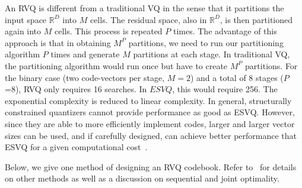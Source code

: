An RVQ is different from a traditional VQ in the sense that it partitions the input space $\mathbb{R}^D$ into $M$ cells.  The residual space, also in $\mathbb{R}^D$, is then partitioned again into $M$ cells.  This process is repeated $P$ times.  The advantage of this approach is that in obtaining $M^P$ partitions, we need to run our partitioning algorithm $P$ times and generate $M$ partitions at each stage.  In traditional VQ, the partitioning algorithm would run once but have to create $M^P$ partitions.  For the binary case (two code-vectors per stage, $M=2$) and a total of 8 stages ($P$=8), RVQ only requires 16 searches.  In $ESVQ$, this would require 256.  The exponential complexity is reduced to linear complexity.  In general, structurally constrained quantizers cannot provide performance as good as ESVQ.  However, since they are able to more efficiently implement codes, larger and larger vector sizes can be used, and if carefully designed, can achieve better performance that ESVQ for a given computational cost~\cite{1996_JNL_AdvancesRVQ_Barnes}.

Below, we give one method of designing an RVQ codebook.  Refer to~\cite{1991_CNF_DesignPerformanceRVQ_Frost,1992_JNL_RVQ_Barnes,1992_CNF_ImageCodingRVQ_Kossentini,1993_sigmaTrees_Barnes,1993_JNL_RVQDSC_Barnes,1995_JNL_OptimalityRVQ_Kossentini,1996_CNF_VQclassification_Barnes,1996_JNL_AdvancesRVQ_Barnes,2002_JNL_SigmaTrees_Barnes,2004_CNF_DSSAdataMining_Barnes,2007_JNL_Katrina_Barnes,2007_JNL_IDDM_Barnes} for details on other methods as well as a discussion on sequential and joint optimality.  

